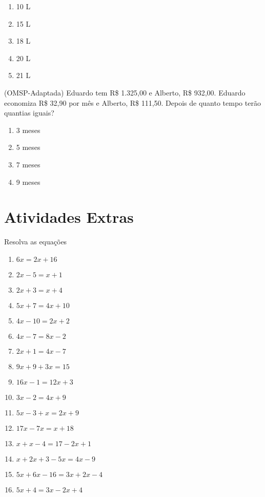 				\begin{multicols}{5}				
				\begin{enumerate}
					\item 10 L
					\item 15 L
					\item 18 L
					\item 20 L
					\item 21 L
				\end{enumerate}
				\end{multicols}
				\item (OMSP-Adaptada) Eduardo tem R\$ 1.325,00 e Alberto, R\$ 932,00. Eduardo economiza R\$ 32,90 por mês e Alberto, R\$ 111,50. Depois de quanto tempo terão quantias iguais?
				\begin{multicols}{4}				
				\begin{enumerate}					
					\item 3 meses
					\item 5 meses
					\item 7 meses
					\item 9 meses
				\end{enumerate}	
				\end{multicols}
				

\section{Atividades Extras}				
		

\item Resolva as equações
\begin{multicols}{2}				
\begin{enumerate}					
	\item $6x = 2x + 16$
	\item $2x - 5 = x + 1$
	\item $2x + 3 = x + 4$
	\item $5x + 7 = 4x + 10$
	\item $4x - 10 = 2x + 2$
	\item $4x - 7 = 8x - 2$
	\item $2x + 1 = 4x - 7$
	\item $9x + 9 + 3x = 15$
	\item $16x - 1 = 12x + 3$
	\item $3x - 2 = 4x + 9$
	\item $5x -3 + x = 2x + 9$
	\item $17x - 7x = x + 18$
	\item $x + x - 4 = 17 - 2x + 1$
	\item $x + 2x + 3 - 5x = 4x - 9$
	\item $5x + 6x - 16 = 3x + 2x - 4$
	\item $5x + 4 = 3x - 2x + 4$
\end{enumerate}	
\end{multicols}

